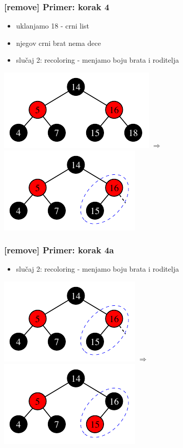 \documentclass[compress,aspectratio=169]{beamer}
\begin{document}
\begin{frame}[fragile]
  \frametitle{[remove] Primer: korak 4}
  \begin{itemize}
    \item uklanjamo 18 - crni list
    \item njegov crni brat nema dece
    \item slučaj 2: recoloring - menjamo boju brata i roditelja
  \end{itemize}
  \begin{center}
    \includegraphics[scale=0.8]{asp-11-del-05.pdf} $\Rightarrow$
    \includegraphics[scale=0.8]{asp-11-del-06.pdf}
  \end{center}
\end{frame}

\begin{frame}[fragile]
  \frametitle{[remove] Primer: korak 4a}
  \begin{itemize}
    \item slučaj 2: recoloring - menjamo boju brata i roditelja
  \end{itemize}
  \begin{center}
    \includegraphics[scale=0.8]{asp-11-del-06.pdf} $\Rightarrow$
    \includegraphics[scale=0.8]{asp-11-del-07.pdf}
  \end{center}
\end{frame}
\end{document}
